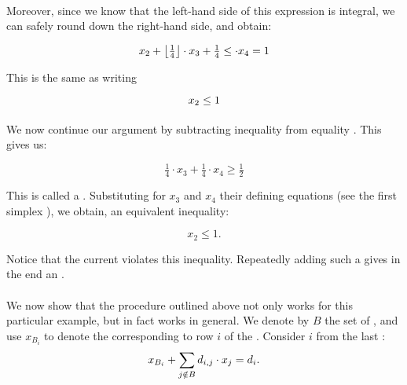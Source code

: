 \begin{example}
\paragraph{}
Moreover, since we know that the left-hand side of this expression is integral, we can safely round down the right-hand side, and obtain:

\begin{equation}
x_2+\left\lfloor \tfrac{1}{4} \right\rfloor\cdot x_3+\tfrac{1}{4}\leq\cdot x_4=1
\end{equation}

This is the same as writing

\begin{equation}
x_2\leq 1\eqnlab{cg-cut-eq2-fin}
\end{equation}

\paragraph{}
We now continue our argument by subtracting inequality  from equality . This gives us:

\begin{equation}
\tfrac{1}{4}\cdot x_3+\tfrac{1}{4}\cdot x_4\geq\tfrac{1}{2}
\end{equation}

This is called a . Substituting for $x_3$ and $x_4$ their defining equations (see the first simplex ), we obtain, an equivalent inequality:

\begin{equation}
x_2\leq 1.
\end{equation}
\end{example}

\begin{note}
Notice that the current  violates this inequality. Repeatedly adding such a  gives in the end an .
\end{note}

\paragraph{}
We now show that the procedure outlined above not only works for this particular example, but in fact works in general. We denote by $B$ the set of , and use $x_{B_i}$ to denote the  corresponding to row $i$ of the . Consider  $i$ from the last :
\begin{equation}
x_{B_i}+\sumndomain[j]{B}{d_{i,j}\cdot x_j}=d_i.\eqnlab{gc-theory1}
\end{equation}

